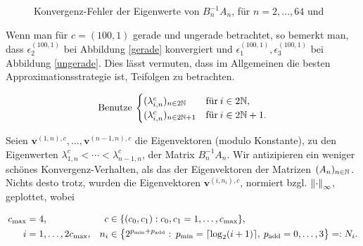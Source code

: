 \begin{figure}[H]
{}
\hspace{0mm}
\caption{Konvergenz-Fehler der Eigenwerte von $B_n^{-1} A_n$, für $n = 2, \ldots, 64$ und}
\label{fig:Konvergenz-Fehler_EW_allgemein_besser}
\end{figure}

Wenn man für $c = (100, 1)$ gerade und ungerade betrachtet, so bemerkt man, dass $\epsilon_2^{(100, 1)}$ bei Abbildung \ref{gerade} konvergiert und $\epsilon_1^{(100, 1)}, \epsilon_3^{(100, 1)}$ bei Abbildung \ref{ungerade}. Dies lässt vermuten, dass im Allgemeinen die besten Approximationsstrategie ist, Teifolgen zu betrachten.

\begin{align*}
  \text{Benutze} \:
  \begin{cases}
    (\lambda_{i, n}^c)_{n \in 2 \N}     & \text{für} \: i \in 2 \N, \\
    (\lambda_{i, n}^c)_{n \in 2 \N + 1} & \text{für} \: i \in 2 \N + 1.
  \end{cases}
\end{align*}

Seien $\mathbf{v}^{(1, n), c}, \ldots, \mathbf{v}^{(n-1, n), c}$ die Eigenvektoren (modulo Konstante), zu den Eigenwerten $\lambda_{1, n}^c < \cdots < \lambda_{n-1, n}^c$, der Matrix $B_n^{-1} A_n$. Wir antizipieren ein weniger schönes Konvergenz-Verhalten, als das der Eigenvektoren der Matrizen $(A_n)_{n \in \N}$. Nichts desto trotz, wurden die Eigenvektoren $\mathbf{v}^{(i, n_i), c}$, normiert bzgl. $\norm[\infty]{\cdot}$, geplottet, wobei

\begin{align*}
  c_{\mathrm{max}} & = 4, &
  c & \in \Bbraces{(c_0, c_1): c_0, c_1 = 1, \ldots, c_{\mathrm{max}}}, \\
  i & = 1, \ldots, 2 c_{\mathrm{max}}, &
  n_i & \in \Bbraces
  {
    2^{p_{\text{min}} + p_{\text{add}}}: \:
    p_{\text{min}} = \ceil{\log_2(i+1)}, \:
    p_{\text{add}} = 0, \ldots, 3
  } =: N_i.
\end{align*}

